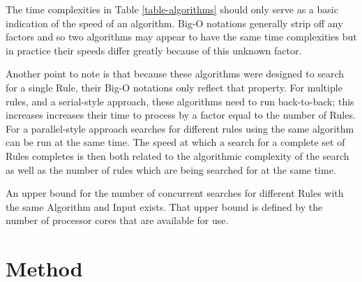 \documentclass[11pt]{article}
\begin{document}
The time complexities in Table \ref{table-algorithms} should only serve as a basic indication of the speed of an algorithm. Big-O notations generally strip off any factors and so two algorithms may appear to have the same time complexities but in practice their speeds differ greatly because of this unknown factor.

Another point to note is that because these algorithms were designed to search for a single Rule, their Big-O notations only reflect that property. For multiple rules, and a serial-style approach, these algorithms need to run back-to-back; this increases increases their time to process by a factor equal to the number of Rules. For a parallel-style approach searches for different rules using the same algorithm can be run at the same time. The speed at which a search for a complete set of Rules completes is then both related to the algorithmic complexity of the search as well as the number of rules which are being searched for at the same time.

An upper bound for the number of concurrent searches for different Rules with the same Algorithm and Input exists. That upper bound is defined by the number of processor cores that are available for use.

\section{Method}
\end{document}
